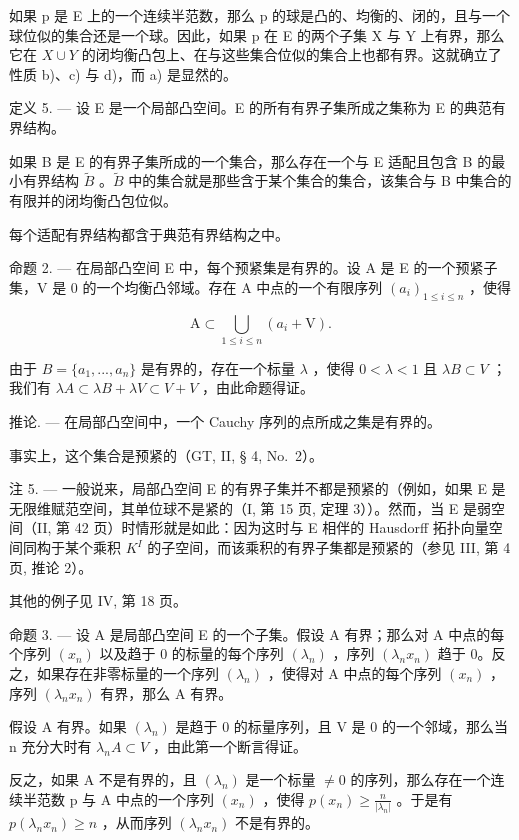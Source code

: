 如果 p 是 E 上的一个连续半范数，那么 p 的球是凸的、均衡的、闭的，且与一个球位似的集合还是一个球。因此，如果 p 在 E 的两个子集 X 与 Y 上有界，那么它在 \(X \cup Y\) 的闭均衡凸包上、在与这些集合位似的集合上也都有界。这就确立了性质 b)、c) 与 d)，而 a) 是显然的。

定义 5. --- 设 E 是一个局部凸空间。E 的所有有界子集所成之集称为 E 的典范有界结构。

如果 B 是 E 的有界子集所成的一个集合，那么存在一个与 E 适配且包含 B 的最小有界结构 \(\tilde{B}\) 。\(\tilde{B}\) 中的集合就是那些含于某个集合的集合，该集合与 B 中集合的有限并的闭均衡凸包位似。

每个适配有界结构都含于典范有界结构之中。

命题 2. --- 在局部凸空间 E 中，每个预紧集是有界的。设 A 是 E 的一个预紧子集，V 是 0 的一个均衡凸邻域。存在 A 中点的一个有限序列 \((a_{i})_{1\leqslant i\leqslant n}\) ，使得

\[
\mathrm{A} \subset \bigcup_ {1 \leqslant i \leqslant n} (a _ {i} + \mathrm{V}).
\]

由于 \(B = \{a_{1}, ..., a_{n}\}\) 是有界的，存在一个标量 \(\lambda\) ，使得 \(0 < \lambda < 1\) 且 \(\lambda B \subset V\) ；我们有 \(\lambda A \subset \lambda B + \lambda V \subset V + V\) ，由此命题得证。

推论. --- 在局部凸空间中，一个 Cauchy 序列的点所成之集是有界的。

事实上，这个集合是预紧的（GT, II, § 4, No.~2）。

注 5. --- 一般说来，局部凸空间 E 的有界子集并不都是预紧的（例如，如果 E 是无限维赋范空间，其单位球不是紧的（I, 第 15 页, 定理 3））。然而，当 E 是弱空间（II, 第 42 页）时情形就是如此：因为这时与 E 相伴的 Hausdorff 拓扑向量空间同构于某个乘积 \(K^{I}\) 的子空间，而该乘积的有界子集都是预紧的（参见 III, 第 4 页, 推论 2）。

其他的例子见 IV, 第 18 页。

命题 3. --- 设 A 是局部凸空间 E 的一个子集。假设 A 有界；那么对 A 中点的每个序列 \((x_{n})\) 以及趋于 0 的标量的每个序列 \((\lambda_{n})\) ，序列 \((\lambda_{n}x_{n})\) 趋于 0。反之，如果存在非零标量的一个序列 \((\lambda_{n})\) ，使得对 A 中点的每个序列 \((x_{n})\) ，序列 \((\lambda_{n}x_{n})\) 有界，那么 A 有界。

假设 A 有界。如果 \((\lambda_{n})\) 是趋于 0 的标量序列，且 V 是 0 的一个邻域，那么当 n 充分大时有 \(\lambda_{n}A \subset V\) ，由此第一个断言得证。

反之，如果 A 不是有界的，且 \((\lambda_{n})\) 是一个标量 \(\neq 0\) 的序列，那么存在一个连续半范数 p 与 A 中点的一个序列 \((x_{n})\) ，使得 \(p(x_{n}) \geqslant \frac{n}{|\lambda_{n}|}\) 。于是有 \(p(\lambda_{n}x_{n}) \geqslant n\) ，从而序列 \((\lambda_{n}x_{n})\) 不是有界的。

